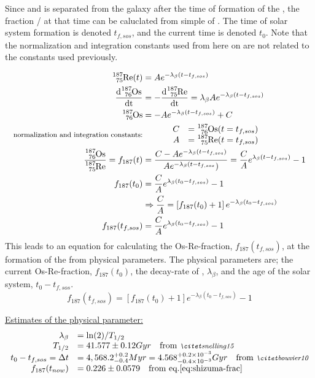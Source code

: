 Since  and  is separated from the galaxy after the time of formation of the \sos,
the fraction / at that time can be caluclated from simple \betadecay of .
The time of solar system formation is denoted $t_{f,sos}$, and the current time is denoted $t_0$.
Note that the normalization and integration constants used from here on are not related to the constants used previously.

\begin{align*}
  \re{187}(t) &= A e^{-\lambda_\beta (t-t_{f,sos})} \\
  \d{\os{187}} &= -\d{\re{187}} = \lambda_\beta A e^{-\lambda_\beta (t-t_{f,sos})} \\
  \os{187} &= - A e^{-\lambda_\beta (t-t_{f,sos})} + C \\
  \textrm{\footnotesize normalization and integration constants:} &
  \hspace{3em}
  \begin{array}{rl}
    C &= \os{187}(t=t_{f,sos}) \\
    A &= \re{187}(t=t_{f,sos})
  \end{array} \\
  \fraction = f_{187}(t) &= \frac{C - Ae^{-\lambda_\beta (t-t_{f,sos})}}{Ae^{-\lambda_\beta (t-t_{f,sos}})}
  = \frac{C}{A}e^{\lambda_\beta (t-t_{f,sos})} - 1 \\
  f_{187}(t_0) &= \frac{C}{A}e^{\lambda_\beta (t_0-t_{f,sos})} - 1 \\
  & \Rightarrow \frac{C}{A} = \left[ f_{187}(t_0) + 1\right]e^{-\lambda_\beta (t_0-t_{f,sos})} \\
  f_{187}(t_{f,sos}) &= \frac{C}{A}e^{\lambda_\beta (t_0-t_{f,sos})} - 1
\end{align*}
This leads to an equation for calculating the Os-Re-fraction, $f_{187}(t_{f,sos})$, at the formation of the \sos from physical parameters.
The physical parameters are; the current Os-Re-fraction, $f_{187}(t_{0})$, the decay-rate of , $\lambda_\beta$, and the age of the solar system, $t_0-t_{f,sos}$.
\begin{equation}
  \label{eq:frac-fsos}
  f_{187}(t_{f,sos}) = \left[ f_{187}(t_0) + 1\right]e^{-\lambda_\beta (t_0-t_{f,sos})} - 1
\end{equation}

\underline{Estimates of the physical parameter:}
\begin{equation}
  \label{eq:parameter-sources}
  \begin{array}{rl}
  \lambda_\beta &= \ln(2)/T_{1/2} \\
  T_{1/2} &= 41.577 \pm 0.12 Gyr \quad \textrm{from \mycite{snelling15}} \\
  t_0 - t_{f,sos} = \Delta t &= 4,568.2^{+0.2}_{-0.4} Myr
  = 4.568^{+0.2\times 10^{-3}}_{-0.4\times 10^{-3}} Gyr \quad \textrm{from \mycite{bouvier10}} \\
  \fracnow &= 0.226 \pm 0.0579 \quad \textrm{from eq.\ref{eq:shizuma-frac}}
  \end{array}
\end{equation}

